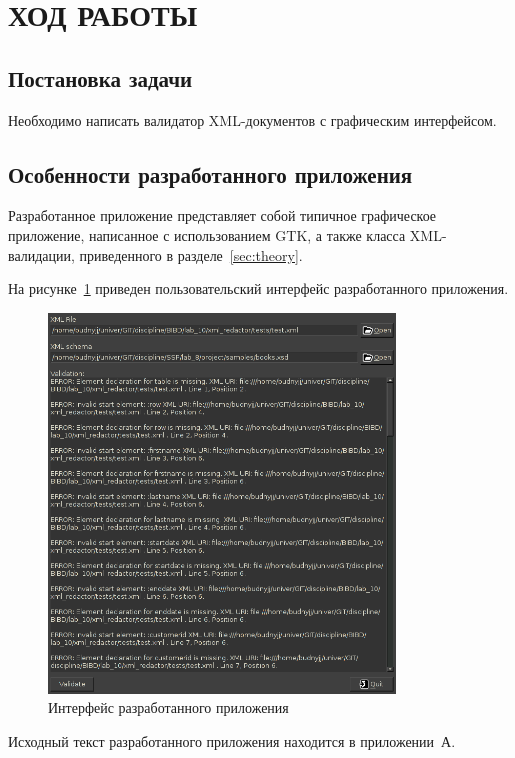 \section{ХОД РАБОТЫ}

\subsection{Постановка задачи}

Необходимо написать валидатор XML-документов с графическим интерфейсом.

\subsection{Особенности разработанного приложения}

Разработанное приложение представляет собой типичное графическое
приложение, написанное с использованием GTK, а также класса XML-валидации,
приведенного в разделе~\ref{sec:theory}.

На рисунке~\ref{pic:interface} приведен пользовательский интерфейс
разработанного приложения.

\begin{figure}[h!]
  \centering
  \includegraphics[width=92mm]{pic/interface}
  \caption{Интерфейс разработанного приложения}
  \label{pic:interface}
\end{figure}

Исходный текст разработанного приложения находится в приложении~А.